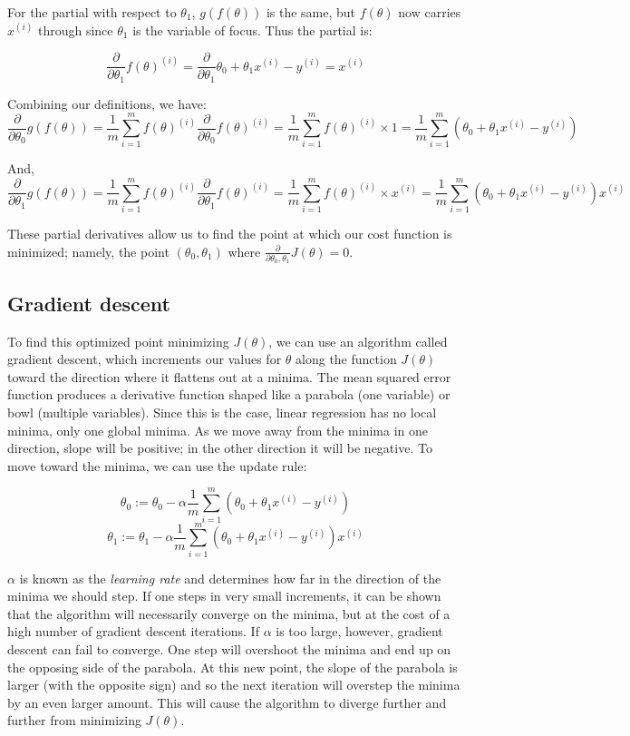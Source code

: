 \documentclass[11pt]{article}
\begin{document}
For the partial with respect to \(\theta_1\), \(g(f(\theta))\) is the same, but
\(f(\theta)\) now carries \(x^{(i)}\) through since \(\theta_1\) is the variable of
focus. Thus the partial is:

\[
\frac{\partial}{\partial \theta_1} f(\theta)^{(i)} = \frac{\partial}{\partial
\theta_1} \theta_0 + \theta_1 x^{(i)} - y^{(i)} = x^{(i)}
\]

Combining our definitions, we have:
\[
\frac{\partial}{\partial \theta_0} g(f(\theta)) = \frac{1}{m} \sum_{i=1}^m
f(\theta)^{(i)} \frac{\partial}{\partial \theta_0} f(\theta)^{(i)} = \frac{1}{m} \sum_{i=1}^m f(\theta)^{(i)} \times 1  = \frac{1}{m} \sum_{i=1}^m \left(\theta_0 + \theta_1 x^{(i)} -
y^{(i)}\right)
\]

And,
\[
\frac{\partial}{\partial \theta_1} g(f(\theta)) = \frac{1}{m} \sum_{i=1}^m
f(\theta)^{(i)} \frac{\partial}{\partial \theta_1} f(\theta)^{(i)} = \frac{1}{m}
\sum_{i=1}^m f(\theta)^{(i)} \times x^{(i)}  = \frac{1}{m} \sum_{i=1}^m
\left(\theta_0 + \theta_1 x^{(i)} - y^{(i)} \right) x^{(i)}
\]

These partial derivatives allow us to find the point at which our cost function is
minimized; namely, the point \((\theta_0, \theta_1)\) where
\(\frac{\partial}{\partial \theta_0, \theta_1} J(\theta) = 0\). 
\subsection{Gradient descent}
\label{sec-1-4}


To find this optimized point minimizing \(J(\theta)\), we can use an algorithm called
gradient descent, which increments our values for \(\theta\) along the function
\(J(\theta)\) toward the direction where it flattens out at a minima. The mean
squared error function produces a derivative function shaped like a parabola (one
variable) or bowl (multiple variables). Since this is the case, linear regression has
no local minima, only one global minima. As we move away from the minima in one
direction, slope will be positive; in the other direction it will be negative. To
move toward the minima, we can use the update rule:

\[
\theta_0 := \theta_0 - \alpha \frac{1}{m} \sum_{i=1}^m \left(\theta_0 + \theta_1
x^{(i)} - y^{(i)} \right)
\]
\[
\theta_1 := \theta_1 - \alpha \frac{1}{m} \sum_{i=1}^m \left(\theta_0 + \theta_1
x^{(i)} - y^{(i)} \right) x^{(i)}
\]

\(\alpha\) is known as the \emph{learning rate} and determines how far in the direction of
the minima we should step. If one steps in very small increments, it can be shown
that the algorithm will necessarily converge on the minima, but at the cost of a high
number of gradient descent iterations. If \(\alpha\) is too large, however, gradient
descent can fail to converge. One step will overshoot the minima and end up on the
opposing side of the parabola. At this new point, the slope of the parabola is larger
(with the opposite sign) and so the next iteration will overstep the minima by an
even larger amount. This will cause the algorithm to diverge further and further from
minimizing \(J(\theta)\).
\end{document}
